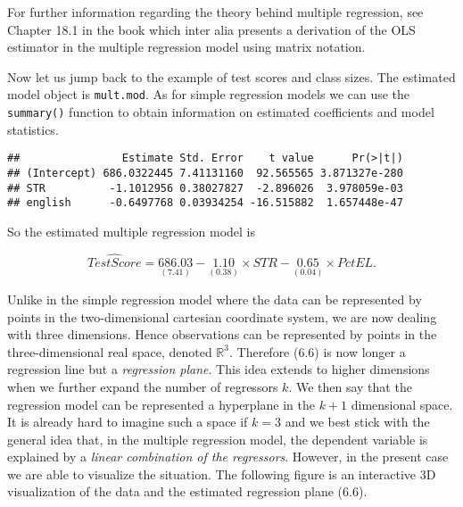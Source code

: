 \documentclass[]{book}
\newenvironment{Shaded}{\begin{snugshade}}{\end{snugshade}}
\newcommand{\KeywordTok}[1]{\textcolor[rgb]{0.13,0.29,0.53}{\textbf{#1}}}
\newcommand{\OperatorTok}[1]{\textcolor[rgb]{0.81,0.36,0.00}{\textbf{#1}}}
\newcommand{\NormalTok}[1]{#1}
\theoremstyle{definition}
\theoremstyle{definition}
\theoremstyle{definition}
\theoremstyle{remark}
\begin{document}
 For further information regarding the theory behind multiple
regression, see Chapter 18.1 in the book which inter alia presents a
derivation of the OLS estimator in the multiple regression model using
matrix notation.

Now let us jump back to the example of test scores and class sizes. The
estimated model object is \texttt{mult.mod}. As for simple regression
models we can use the \texttt{summary()} function to obtain information
on estimated coefficients and model statistics.

\begin{Shaded}
\end{Shaded}

\begin{verbatim}
##                Estimate Std. Error    t value      Pr(>|t|)
## (Intercept) 686.0322445 7.41131160  92.565565 3.871327e-280
## STR          -1.1012956 0.38027827  -2.896026  3.978059e-03
## english      -0.6497768 0.03934254 -16.515882  1.657448e-47
\end{verbatim}

So the estimated multiple regression model is

\[ \widehat{TestScore} = \underset{(7.41)}{686.03} - \underset{(0.38)}{1.10} \times STR - \underset{(0.04)}{0.65} \times PctEL \tag{6.6}.  \]

Unlike in the simple regression model where the data can be represented
by points in the two-dimensional cartesian coordinate system, we are now
dealing with three dimensions. Hence observations can be represented by
points in the three-dimensional real space, denoted \(\mathbb{R}^3\).
Therefore (6.6) is now longer a regression line but a \emph{regression
plane}. This idea extends to higher dimensions when we further expand
the number of regressors \(k\). We then say that the regression model
can be represented a hyperplane in the \(k+1\) dimensional space. It is
already hard to imagine such a space if \(k=3\) and we best stick with
the general idea that, in the multiple regression model, the dependent
variable is explained by a \emph{linear combination of the regressors}.
However, in the present case we are able to visualize the situation. The
following figure is an interactive 3D visualization of the data and the
estimated regression plane (6.6).

\hypertarget{14f931e9bc8dd}{}
\end{document}

